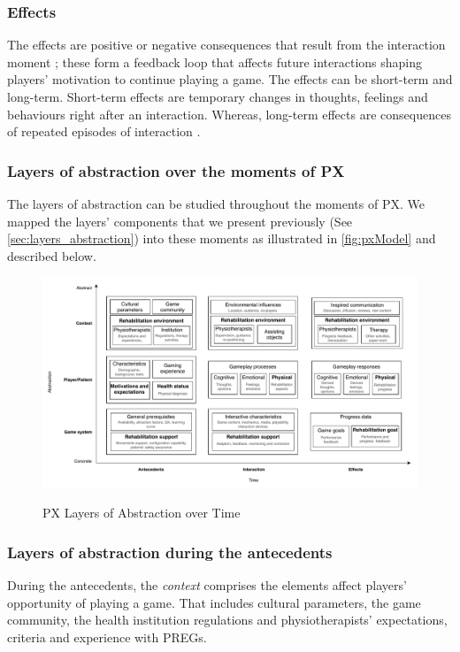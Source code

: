 \subsubsection*{Effects}
The effects are positive or negative consequences that result from the interaction moment \autocite{Fernandez2008}; these form a feedback loop that affects future interactions \autocite{Nacked,Elson2014} shaping players' motivation to continue playing a game. The effects can be short-term and long-term. Short-term effects are temporary changes in thoughts, feelings and behaviours right after an interaction. Whereas, long-term effects are consequences of repeated episodes of interaction \autocite{Elson2014}.

\subsubsection{Layers of abstraction over the moments of \ac{PX}}
\label{sec:rel_among_dimensions}
The layers of abstraction can be studied throughout the moments of \ac{PX}. We mapped the layers' components that we present previously (See \autoref{sec:layers_abstraction}) into these moments as illustrated in \autoref{fig:pxModel} and described below.

\begin{figure}[bth]
\myfloatalign
{\includegraphics[width=\linewidth]{gfx/model/pxModel}} \quad
\caption{\ac{PX} Layers of Abstraction over Time}\label{fig:pxModel}
\end{figure}

\subsubsection*{Layers of abstraction during the antecedents}
During the antecedents, the \textit{context} comprises the elements affect players' opportunity of playing a game. That includes cultural parameters, the game community, the health institution regulations and physiotherapists' expectations, criteria and experience with \acp{PREG}.

